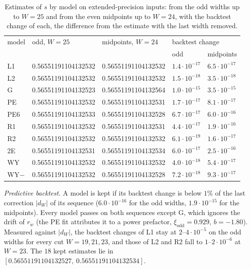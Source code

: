 \documentclass[11pt]{amsart}
\theoremstyle{definition}
\theoremstyle{remark}
\begin{document}
\begin{table}[ht]
\caption{Estimates of $s$ by model on extended-precision inputs: from the odd widths up to
$W = 25$ and from the even midpoints up to $W = 24$, with the backtest change of each, the
difference from the estimate with the last width removed.}
\label{tab:models}
\begin{tabular}{lllll}
\toprule
model & odd, $W = 25$ & midpoints, $W = 24$ & \multicolumn{2}{l}{backtest change} \\
 & & & odd & midpoints \\
\midrule
L1   & 0.56551191104132532 & 0.56551191104132532 & $1.4\cdot10^{-17}$ & $6.5\cdot10^{-17}$ \\
L2   & 0.56551191104132532 & 0.56551191104132532 & $1.5\cdot10^{-18}$ & $3.5\cdot10^{-18}$ \\
G    & 0.56551191104132523 & 0.56551191104132564 & $1.0\cdot10^{-15}$ & $3.5\cdot10^{-15}$ \\
PE   & 0.56551191104132532 & 0.56551191104132531 & $1.7\cdot10^{-17}$ & $8.1\cdot10^{-17}$ \\
PE6  & 0.56551191104132533 & 0.56551191104132528 & $6.7\cdot10^{-17}$ & $6.0\cdot10^{-16}$ \\
R1   & 0.56551191104132532 & 0.56551191104132531 & $4.4\cdot10^{-17}$ & $1.9\cdot10^{-16}$ \\
R2   & 0.56551191104132532 & 0.56551191104132532 & $6.1\cdot10^{-19}$ & $1.6\cdot10^{-17}$ \\
2E   & 0.56551191104132531 & 0.56551191104132534 & $6.0\cdot10^{-17}$ & $2.5\cdot10^{-16}$ \\
WY   & 0.56551191104132532 & 0.56551191104132532 & $4.0\cdot10^{-18}$ & $5.4\cdot10^{-17}$ \\
WY$-$& 0.56551191104132532 & 0.56551191104132528 & $7.2\cdot10^{-18}$ & $9.3\cdot10^{-17}$ \\
\bottomrule
\end{tabular}
\end{table}

\emph{Predictive backtest.} A model is kept if its backtest change is below $1\%$ of the last
correction $|d_W|$ of its sequence ($6.0\cdot10^{-16}$ for the odd widths, $1.9\cdot10^{-15}$ for
the midpoints). Every model passes on both sequences except G, which ignores the drift of $r_w$
(the PE fit attributes it to a power prefactor, $\xi_{\mathrm{odd}} = 0.929$, $b = -1.80$). Measured
against $|d_W|$, the backtest changes of L1 stay at $2$--$4\cdot10^{-5}$ on the odd widths for every
cut $W = 19, 21, 23$, and those of L2 and R2 fall to $1$--$2\cdot10^{-6}$ at $W = 23$. The $18$ kept estimates lie in
$[0.56551191104132527,\ 0.56551191104132534]$.
\end{document}
